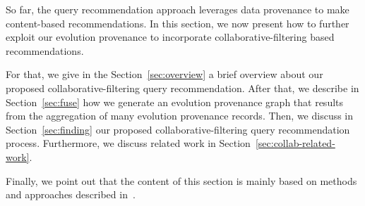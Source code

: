 \label{sec:intro2}

So far, the query recommendation approach leverages data provenance to make content-based recommendations. In this section, we now present how to further exploit our evolution provenance to incorporate collaborative-filtering based recommendations.


For that, we give in the Section~\ref{sec:overview} a brief overview about our proposed collaborative-filtering query recommendation. 
After that, we describe in Section~\ref{sec:fuse} how we generate an evolution provenance graph that results from the aggregation of many evolution provenance records. 
Then, we discuss in Section~\ref{sec:finding} our proposed collaborative-filtering query recommendation process.
Furthermore, we discuss related work in Section~\ref{sec:collab-related-work}.


Finally, we point out that the content of this section is mainly based on methods and approaches described in~\cite{Houssem:19:adbis,Houssem:19:IS}.

